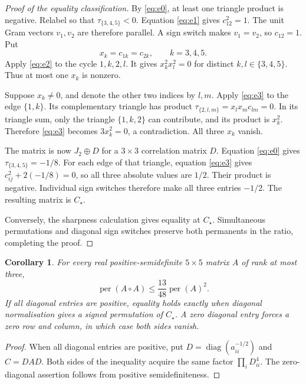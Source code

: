 \documentclass[11pt,a4paper]{article}
\newcommand{\per}{\operatorname{per}}
\newtheorem{corollary}[theorem]{Corollary}
\theoremstyle{remark}\newtheorem{remark}[theorem]{Remark}
\begin{document}
\begin{proof}[Proof of the equality classification]
By \eqref{eq:e0}, at least one triangle product is negative. Relabel so that $\tau_{\{3,4,5\}}<0$. Equation \eqref{eq:e1} gives $c_{12}^2=1$. The unit Gram vectors $v_1,v_2$ are therefore parallel. A sign switch makes $v_1=v_2$, so $c_{12}=1$. Put
\[
 x_k=c_{1k}=c_{2k},\qquad k=3,4,5.
\]
Apply \eqref{eq:e2} to the cycle $1,k,2,l$. It gives $x_k^2x_l^2=0$ for distinct $k,l\in\{3,4,5\}$. Thus at most one $x_k$ is nonzero.

Suppose $x_k\ne0$, and denote the other two indices by $l,m$. Apply \eqref{eq:e3} to the edge $\{1,k\}$. Its complementary triangle has product
$\tau_{\{2,l,m\}}=x_lx_mc_{lm}=0$. In its triangle sum, only the triangle $\{1,k,2\}$ can contribute, and its product is $x_k^2$. Therefore \eqref{eq:e3} becomes $3x_k^2=0$, a contradiction. All three $x_k$ vanish.

The matrix is now $J_2\oplus D$ for a $3\times3$ correlation matrix $D$. Equation \eqref{eq:e0} gives $\tau_{\{3,4,5\}}=-1/8$. For each edge of that triangle, equation \eqref{eq:e3} gives $c_{ij}^2+2(-1/8)=0$, so all three absolute values are $1/2$. Their product is negative. Individual sign switches therefore make all three entries $-1/2$. The resulting matrix is $C_\star$.

Conversely, the sharpness calculation gives equality at $C_\star$. Simultaneous permutations and diagonal sign switches preserve both permanents in the ratio, completing the proof.
\end{proof}

\begin{corollary}
For every real positive-semidefinite $5\times5$ matrix $A$ of rank at most three,
\[
 \per(A\circ A)\leq\frac{13}{48}\per(A)^2.
\]
If all diagonal entries are positive, equality holds exactly when diagonal normalisation gives a signed permutation of $C_\star$. A zero diagonal entry forces a zero row and column, in which case both sides vanish.
\end{corollary}
\begin{proof}
When all diagonal entries are positive, put $D=\operatorname{diag}(a_{ii}^{-1/2})$ and $C=DAD$. Both sides of the inequality acquire the same factor $\prod_i D_{ii}^4$. The zero-diagonal assertion follows from positive semidefiniteness.
\end{proof}
\end{document}
